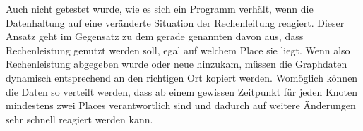 Auch nicht getestet wurde, wie es sich ein Programm verhält, wenn die Datenhaltung auf eine veränderte Situation der Rechenleitung reagiert. Dieser Ansatz geht im Gegensatz zu dem gerade genannten davon aus, dass Rechenleistung genutzt werden soll, egal auf welchem Place sie liegt. Wenn also Rechenleistung abgegeben wurde oder neue hinzukam, müssen die Graphdaten dynamisch entsprechend an den richtigen Ort kopiert werden. Womöglich können die Daten so verteilt werden, dass ab einem gewissen Zeitpunkt für jeden Knoten mindestens zwei Places verantwortlich sind und dadurch auf weitere Änderungen sehr schnell reagiert werden kann.


